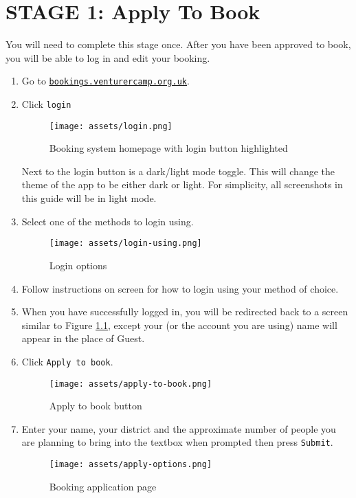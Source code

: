 \chapter{STAGE 1: Apply To Book}
\label{chap:apply}

You will need to complete this stage once. After you have been approved to book, you will be able to log in and edit your booking.

\begin{enumerate}
    \item Go to \href{https://bookings.venturercamp.org.uk/}{\texttt{bookings.venturercamp.org.uk}}.
    \item Click \verb|login|
    \begin{figure}[H]
        \centering
        \texttt{[image: assets/login.png]}
        \caption{Booking system homepage with login button highlighted}
        \label{fig:login}
    \end{figure}
    Next to the login button is a dark/light mode toggle. This will change the theme of the app to be either dark or light. For simplicity, all screenshots in this guide will be in light mode.
    \item Select one of the methods to login using. 
    \begin{figure}[H]
        \centering
        \texttt{[image: assets/login-using.png]}
        \caption{Login options}
    \end{figure}
    \item Follow instructions on screen for how to login using your method of choice.
    \item When you have successfully logged in, you will be redirected back to a screen similar to Figure \ref*{fig:login}, except your (or the account you are using) name will appear in the place of Guest.
    \item Click \verb|Apply to book|.
    \begin{figure}[H]
        \centering
        \texttt{[image: assets/apply-to-book.png]}
        \caption{Apply to book button}
    \end{figure}
    \item Enter your name, your district and the approximate number of people you are planning to bring into the textbox when prompted then press \verb|Submit|.
    \begin{figure}[H]
        \centering
        \texttt{[image: assets/apply-options.png]}
        \caption{Booking application page}

\end{figure}
\end{enumerate}
